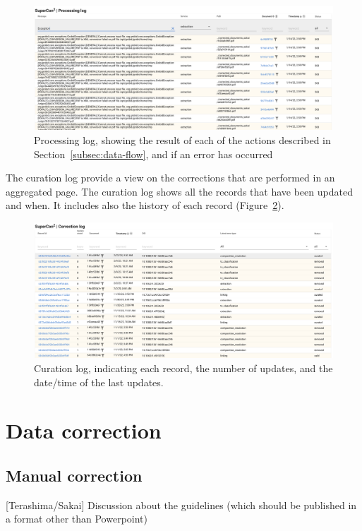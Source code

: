 \documentclass{article}
\begin{document}
\begin{figure}
  \centering
  \includegraphics[width=1\textwidth]{images/processing-log.png} 
  \caption{Processing log, showing the result of each of the actions described in Section~\ref{subsec:data-flow}, and if an error has occurred}
  \label{fig:processing-log}
\end{figure}

The curation log provide a view on the corrections that are performed in an aggregated page. 
The curation log shows all the records that have been updated and when. It includes also the history of each record (Figure~\ref{fig:curation-log}).

\begin{figure}[t]
  \centering
  \includegraphics[width=1\textwidth]{images/curation-log} 
  \caption{Curation log, indicating each record, the number of updates, and the date/time of the last updates. }
  \label{fig:curation-log}
\end{figure}


\section{Data correction}

\subsection{Manual correction}
[Terashima/Sakai] Discussion about the guidelines (which should be published in a format other than Powerpoint)
\end{document}
